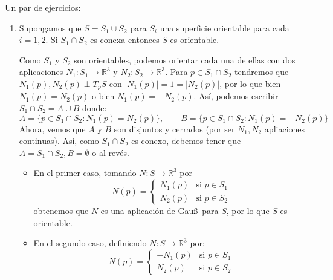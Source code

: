 \begin{ejercicio}
    Un par de ejercicios:
    \begin{enumerate}
        \item Supongamos que $S = S_1\cup S_2$ para $S_i$ una superficie orientable para cada $i=1,2$. Si $S_1\cap S_2$ es conexa entonces $S$ es orientable.

            Como $S_1$ y $S_2$ son orientables, podemos orientar cada una de ellas con dos aplicaciones $N_1:S_1\to \mathbb{R}^3$ y $N_2:S_2\to\mathbb{R}^3$. Para $p\in S_1\cap S_2$ tendremos que $N_1(p),N_2(p)\perp T_pS$ con $|N_1(p)| = 1 = |N_2(p)|$, por lo que bien $N_1(p) = N_2(p)$ o bien $N_1(p) = -N_2(p)$. Así, podemos escribir $S_1\cap S_2 = A\cup B$ donde:
            \begin{equation*}
                A = \{p\in S_1\cap S_2 : N_1(p) = N_2(p)\}, \qquad B = \{p\in S_1\cap S_2 : N_1(p) = -N_2(p)\}
            \end{equation*}
            Ahora, vemos que $A$ y $B$ son disjuntos y cerrados (por ser $N_1,N_2$ apliaciones continuas). Así, como $S_1\cap S_2$ es conexo, debemos tener que $A=S_1\cap S_2,B=\emptyset $ o al revés.
            \begin{itemize}
                \item En el primer caso, tomando $N:S\to \mathbb{R}^3$ por
                    \begin{equation*}
                        N(p) = \left\{\begin{array}{ll}
                            N_1(p) & \text{si\ } p\in S_1 \\
                             N_2(p) & \text{si\ } p\in S_2
                        \end{array}\right. 
                    \end{equation*}
                    obtenemos que $N$ es una aplicación de Gau\ss\ para $S$, por lo que $S$ es orientable.
                \item En el segundo caso, definiendo $N:S\to \mathbb{R}^3$ por:
                    \begin{equation*}
                        N(p) = \left\{\begin{array}{ll}
                            -N_1(p) & \text{si\ } p\in S_1 \\
                            N_2(p) & \text{si\ } p\in S_2
                        \end{array}\right. 
                    \end{equation*}

\end{itemize}
\end{enumerate}
\end{ejercicio}
